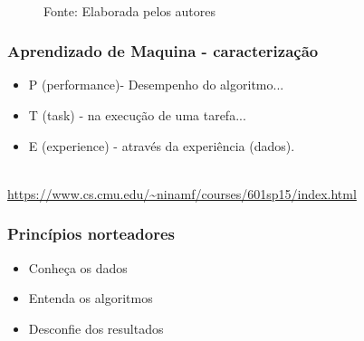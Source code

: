 \documentclass[11pt, aspectratio=169]{beamer}
\begin{document}
\begin{frame}
\begin{figure}[ht]
\begin{minipage}[b]{0.45\linewidth}
    \\{\footnotesize Fonte: Elaborada pelos autores}
    \label{fig:diag_ml}
  \end{minipage}
\end{figure}
\end{frame}



\begin{frame}
  \frametitle{Aprendizado de Maquina - caracterização}


  \begin{Large}
    \begin{center}
      \begin{itemize}
        \item P (performance)- Desempenho do algoritmo...
        \item T (task) - na execução de uma tarefa...
        \item E (experience) - através da experiência (dados).
      \end{itemize}
    \end{center}
  \end{Large}
  \cite{mitchell1997}\\
  \url{https://www.cs.cmu.edu/~ninamf/courses/601sp15/index.html}

\end{frame}


\begin{frame}
  \frametitle{Princípios norteadores}

  \begin{Large}
    \begin{center}
      \begin{itemize}
        \item Conheça os dados
        \item Entenda os algoritmos
        \item Desconfie dos resultados
      \end{itemize}
    \end{center}
  \end{Large}

\end{frame}
\end{document}
